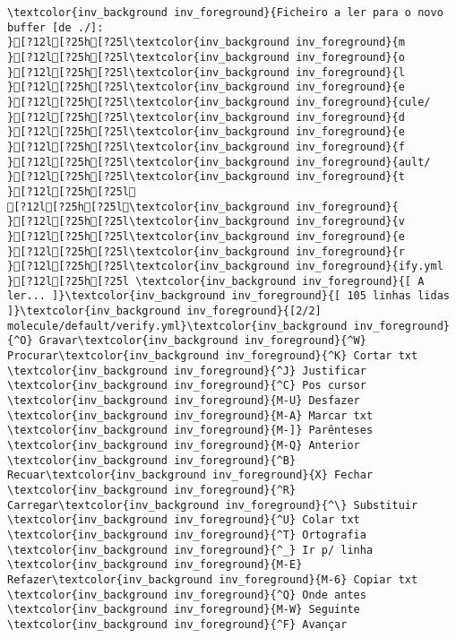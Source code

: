 \documentclass{scrartcl}
\begin{document}
\begin{Verbatim}
\textcolor{inv_background inv_foreground}{Ficheiro a ler para o novo buffer [de ./]:                                                                                                                                                   }[?12l[?25h[?25l\textcolor{inv_background inv_foreground}{m
}[?12l[?25h[?25l\textcolor{inv_background inv_foreground}{o
}[?12l[?25h[?25l\textcolor{inv_background inv_foreground}{l
}[?12l[?25h[?25l\textcolor{inv_background inv_foreground}{e
}[?12l[?25h[?25l\textcolor{inv_background inv_foreground}{cule/
}[?12l[?25h[?25l\textcolor{inv_background inv_foreground}{d
}[?12l[?25h[?25l\textcolor{inv_background inv_foreground}{e
}[?12l[?25h[?25l\textcolor{inv_background inv_foreground}{f
}[?12l[?25h[?25l\textcolor{inv_background inv_foreground}{ault/
}[?12l[?25h[?25l\textcolor{inv_background inv_foreground}{t
}[?12l[?25h[?25l
[?12l[?25h[?25l\textcolor{inv_background inv_foreground}{ 
}[?12l[?25h[?25l\textcolor{inv_background inv_foreground}{v
}[?12l[?25h[?25l\textcolor{inv_background inv_foreground}{e
}[?12l[?25h[?25l\textcolor{inv_background inv_foreground}{r
}[?12l[?25h[?25l\textcolor{inv_background inv_foreground}{ify.yml
}[?12l[?25h[?25l \textcolor{inv_background inv_foreground}{[ A ler... ]}\textcolor{inv_background inv_foreground}{[ 105 linhas lidas ]}\textcolor{inv_background inv_foreground}{[2/2]       molecule/default/verify.yml}\textcolor{inv_background inv_foreground}{^O} Gravar\textcolor{inv_background inv_foreground}{^W} Procurar\textcolor{inv_background inv_foreground}{^K} Cortar txt    \textcolor{inv_background inv_foreground}{^J} Justificar    \textcolor{inv_background inv_foreground}{^C} Pos cursor    \textcolor{inv_background inv_foreground}{M-U} Desfazer     \textcolor{inv_background inv_foreground}{M-A} Marcar txt   \textcolor{inv_background inv_foreground}{M-]} Parênteses   \textcolor{inv_background inv_foreground}{M-Q} Anterior     \textcolor{inv_background inv_foreground}{^B} Recuar\textcolor{inv_background inv_foreground}{X} Fechar  \textcolor{inv_background inv_foreground}{^R} Carregar\textcolor{inv_background inv_foreground}{^\} Substituir    \textcolor{inv_background inv_foreground}{^U} Colar txt     \textcolor{inv_background inv_foreground}{^T} Ortografia    \textcolor{inv_background inv_foreground}{^_} Ir p/ linha   \textcolor{inv_background inv_foreground}{M-E} Refazer\textcolor{inv_background inv_foreground}{M-6} Copiar txt   \textcolor{inv_background inv_foreground}{^Q} Onde antes    \textcolor{inv_background inv_foreground}{M-W} Seguinte     \textcolor{inv_background inv_foreground}{^F} Avançar

\end{Verbatim}
\end{document}
